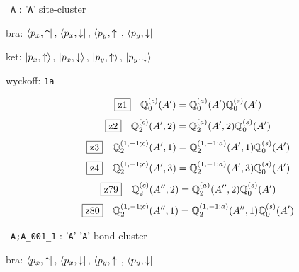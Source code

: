 \documentclass[fleqn,10pt,landscape]{jsarticle}
\begin{document}
\vspace{5mm}

\noindent\textbullet\, \texttt{A} : '\texttt{A}' site-cluster

\noindent\quad * bra: $\bra{p_{x},\uparrow},\, \bra{p_{x},\downarrow},\, \bra{p_{y},\uparrow},\, \bra{p_{y},\downarrow}$

\noindent\quad * ket: $\ket{p_{x},\uparrow},\, \ket{p_{x},\downarrow},\, \ket{p_{y},\uparrow},\, \ket{p_{y},\downarrow}$

\noindent\quad * wyckoff: \texttt{1a}

\begin{dmath*}
\hspace*{3mm}\fbox{z1}\quad \mathbb{Q}_{0}^{(c)}(A^{\prime})=\mathbb{Q}_{0}^{(a)}(A^{\prime}) \mathbb{Q}_{0}^{(s)}(A^{\prime})
\end{dmath*}
\begin{dmath*}
\hspace*{3mm}\fbox{z2}\quad \mathbb{Q}_{2}^{(c)}(A^{\prime},2)=\mathbb{Q}_{2}^{(a)}(A^{\prime},2) \mathbb{Q}_{0}^{(s)}(A^{\prime})
\end{dmath*}
\begin{dmath*}
\hspace*{3mm}\fbox{z3}\quad \mathbb{Q}_{2}^{(1,-1;c)}(A^{\prime},1)=\mathbb{Q}_{2}^{(1,-1;a)}(A^{\prime},1) \mathbb{Q}_{0}^{(s)}(A^{\prime})
\end{dmath*}
\begin{dmath*}
\hspace*{3mm}\fbox{z4}\quad \mathbb{Q}_{2}^{(1,-1;c)}(A^{\prime},3)=\mathbb{Q}_{2}^{(1,-1;a)}(A^{\prime},3) \mathbb{Q}_{0}^{(s)}(A^{\prime})
\end{dmath*}
\begin{dmath*}
\hspace*{3mm}\fbox{z79}\quad \mathbb{Q}_{2}^{(c)}(A^{\prime\prime},2)=\mathbb{Q}_{2}^{(a)}(A^{\prime\prime},2) \mathbb{Q}_{0}^{(s)}(A^{\prime})
\end{dmath*}
\begin{dmath*}
\hspace*{3mm}\fbox{z80}\quad \mathbb{Q}_{2}^{(1,-1;c)}(A^{\prime\prime},1)=\mathbb{Q}_{2}^{(1,-1;a)}(A^{\prime\prime},1) \mathbb{Q}_{0}^{(s)}(A^{\prime})
\end{dmath*}
\vspace{5mm}

\noindent\textbullet\, \texttt{A;A_001_1} : '\texttt{A}'-'\texttt{A}' bond-cluster

\noindent\quad * bra: $\bra{p_{x},\uparrow},\, \bra{p_{x},\downarrow},\, \bra{p_{y},\uparrow},\, \bra{p_{y},\downarrow}$
\end{document}
